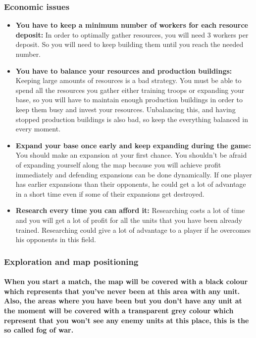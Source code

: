 \documentclass[a4paper,10pt]{article}
\newcommand{\p}[1]{\paragraph{\indent\textnormal{#1}}}
\begin{document}
      \subsubsection{Economic issues}
	\begin{itemize}
	\item \textbf{You have to keep a minimum number of workers for each resource deposit:} In order to optimally gather resources, you will need 3 workers per deposit. So you will need to keep building them until you reach the needed number.

        \item \textbf{You have to balance your resources and production buildings:} Keeping large amounts of resources is a bad strategy. You must be able to spend all the resources you gather either training troops or expanding your base, so you will have to maintain enough production buildings in order to keep them busy and invest your resources. Unbalancing this, and having stopped production buildings  is also bad, so keep the everything balanced in every moment.

	\item \textbf{Expand your base once early and keep expanding during the game:} You should make an expansion at your first chance. You shouldn't be afraid of expanding yourself along the map because you will achieve profit immediately and defending expansions can be done dynamically. If one player has earlier expansions than their opponents, he could get a lot of advantage in a short time even if some of their expansions get destroyed.

	\item \textbf{Research every time you can afford it:} Researching costs a lot of time and you will get a lot of profit for all the units that you have been already trained. Researching could give a lot of advantage to a player if he overcomes his opponents in this field.

	\end{itemize}


  \subsubsection{Exploration and map positioning}


    \p{When you start a match, the map will be covered with a black colour which represents that you've never been at this area with any unit. Also, the areas where you have been but you don't have any unit at the moment will be covered with a transparent grey colour which represent that you won't see any enemy units at this place, this is the so called fog of war.}
\end{document}
